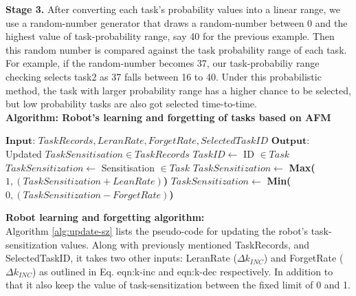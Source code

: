 \textbf{Stage 3.} After converting each task's probability values into a linear range, we use a random-number generator that draws a random-number between 0 and the highest value of task-probability range, say 40 for the previous example. Then this random number is compared against the task probability range of each task. For example, if the random-number becomes 37, our task-probabiliy range checking selects task2 as 37 falls between 16 to 40. Under this probabilistic method, the task with larger probability range has a  higher chance to be selected, but low probability tasks are also got selected time-to-time.\\
\textbf{Algorithm: Robot's learning and forgetting of tasks based on AFM}
\begin{algorithmic}[1]
\begin{small}
\label{alg:update-sz}
\State $\textbf{Input: }  TaskRecords, LeranRate, ForgetRate, SelectedTaskID$
\State $\textbf{Output: }$ Updated $TaskSensitisation \in TaskRecords$
\State $ TaskID \gets  $ ID $\in Task$
\State $ TaskSensitization \gets  $   Sensitisation $ \in Task$
\State $ TaskSensitization \gets $ \textbf{Max(}$1, (TaskSensitization + LeanRate)$\textbf{)}
\Else
\State $ TaskSensitization \gets $ \textbf{Min(}$0, (TaskSensitization - ForgetRate)$\textbf{)}
\EndIf
\EndFor
\end{small}
\end{algorithmic}
\textbf{Robot learning and forgetting algorithm:}\\
Algorithm \ref{alg:update-sz} lists the pseudo-code for updating the robot's task-sensitization values. Along with previously mentioned TaskRecords, and  SelectedTaskID, it takes two other inputs: LeranRate ($\Delta k_{INC} $) and ForgetRate ($\Delta k_{INC} $) as outlined in Eq. {eqn:k-inc} and {eqn:k-dec} respectively.  In addition to that it also keep the value of task-sensitization between the fixed limit of 0 and 1.
